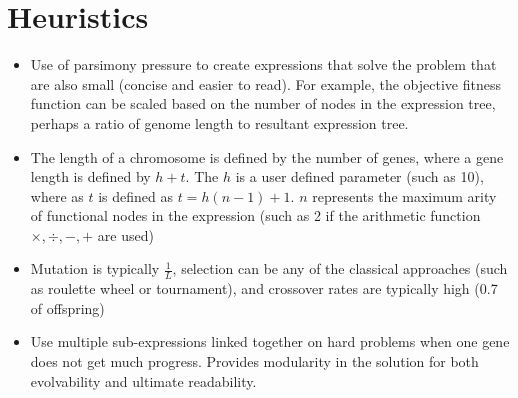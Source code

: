 \documentclass[a4paper, 11pt]{article}
\begin{document}
\section{Heuristics}
\label{sec:heuristics}
\begin{itemize}
	\item Use of parsimony pressure to create expressions that solve the problem that are also small (concise and easier to read). For example, the objective fitness function can be scaled based on the number of nodes in the expression tree, perhaps a ratio of genome length to resultant expression tree.
	\item The length of a chromosome is defined by the number of genes, where a gene length is defined by $h + t$. The $h$ is a user defined parameter (such as 10), where as $t$ is defined as $t = h (n-1) + 1$. $n$ represents the maximum arity of functional nodes in the expression (such as 2 if the arithmetic function $\times, \div, -, +$ are used)
	\item Mutation is typically $\frac{1}{L}$, selection can be any of the classical approaches (such as roulette wheel or tournament), and crossover rates are typically high (0.7 of offspring)
	\item Use multiple sub-expressions linked together on hard problems when one gene does not get much progress. Provides modularity in the solution for both evolvability and ultimate readability.
\end{itemize}

\end{document}
